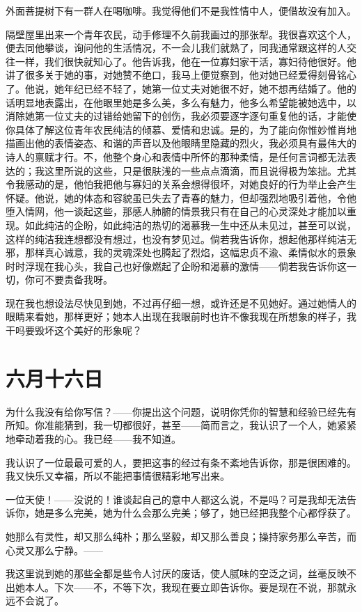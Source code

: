 \documentclass[12pt,oneside]{book}
\begin{document}
外面菩提树下有一群人在喝咖啡。我觉得他们不是我性情中人，便借故没有加入。

隔壁屋里出来一个青年农民，动手修理不久前我画过的那张犁。我很喜欢这个人，便去同他攀谈，询问他的生活情况，不一会儿我们就熟了，同我通常跟这样的人交往一样，我们很快就知心了。他告诉我，他在一位寡妇家干活，寡妇待他很好。他讲了很多关于她的事，对她赞不绝口，我马上便觉察到，他对她已经爱得刻骨铭心了。他说，她年纪已经不轻了，她第一位丈夫对她很不好，她不想再结婚了。他的话明显地表露出，在他眼里她是多么美，多么有魅力，他多么希望能被她选中，以消除她第一位丈夫的过错给她留下的创伤，我必须要逐字逐句重复他的话，才能使你具体了解这位青年农民纯洁的倾慕、爱情和忠诚。是的，为了能向你惟妙惟肖地描画出他的表情姿态、和谐的声音以及他眼睛里隐藏的烈火，我必须具有最伟大的诗人的禀赋才行。不，他整个身心和表情中所怀的那种柔情，是任何言词都无法表达的；我这里所说的这些，只是很肤浅的一些点点滴滴，而且说得极为笨拙。尤其令我感动的是，他怕我把他与寡妇的关系会想得很坏，对她良好的行为举止会产生怀疑。他说，她的体态和容貌虽已失去了青春的魅力，但却强烈地吸引着他，令他堕入情网，他一谈起这些，那感人肺腑的情景我只有在自己的心灵深处才能加以重现。如此纯洁的企盼，如此纯洁的热切的渴慕我一生中还从未见过，甚至可以说，这样的纯洁我连想都没有想过，也没有梦见过。倘若我告诉你，想起他那样纯洁无邪，那样真心诚意，我的灵魂深处也腾起了烈焰，这幅忠贞不渝、柔情似水的景象时时浮现在我心头，我自己也好像燃起了企盼和渴慕的激情——倘若我告诉你这一切，你可不要责备我呀。

现在我也想设法尽快见到她，不过再仔细一想，或许还是不见她好。通过她情人的眼睛来看她，那样更好；她本人出现在我眼前时也许不像我现在所想象的样子，我干吗要毁坏这个美好的形象呢？

\chapter{六月十六日}
\label{sec-2-11}
为什么我没有给你写信？——你提出这个问题，说明你凭你的智慧和经验已经先有所知。你准能猜到，我一切都很好，甚至——简而言之，我认识了一个人，她紧紧地牵动着我的心。我已经——我不知道。

我认识了一位最最可爱的人，要把这事的经过有条不紊地告诉你，那是很困难的。我又快乐又幸福，所以不能把事情很精彩地写出来。

一位天使！——没说的！谁谈起自己的意中人都这么说，不是吗？可是我却无法告诉你，她是多么完美，她为什么会那么完美；够了，她已经把我整个心都俘获了。

她那么有灵性，却又那么纯朴；那么坚毅，却又那么善良；操持家务那么辛苦，而心灵又那么宁静。——

我这里说到她的那些全都是些令人讨厌的废话，使人腻味的空泛之词，丝毫反映不出她本人。下次——不，不等下次，我现在要立即告诉你。要是现在不说，那就永远不会说了。
\end{document}
